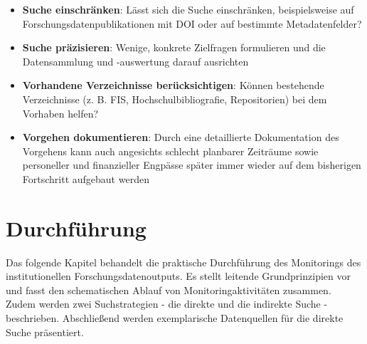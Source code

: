 \documentclass[
  ngerman,
  letterpaper,
  DIV=11]{scrreprt}
\providecommand{\tightlist}{%
  \setlength{\itemsep}{0pt}\setlength{\parskip}{0pt}}
\begin{document}
\begin{tcolorbox}
\begin{itemize}
\begin{itemize}
    \begin{itemize}
    \tightlist
    \item
      \textbf{Abfragemöglichkeiten}: Passen sie zu den vorhandenen
      technischen Möglichkeiten? Kann z. B. die geplante Suchanfrage
      über die Nutzeroberfläche gestellt werden, falls keine Nutzung der
      API möglich ist? Ist ein Komplettexport der Trefferliste in einem
      geeigneten Dateiformat möglich?
    \item
      \textbf{Metadaten}: Sind bestimmte Metadaten besonders wichtig (z.
      B. Affiliations-Metadatenfeld)? Können diese bei der gewählten
      Datenquelle abgefragt werden?
    \item
      \textbf{Offenheit}: Ist die Datenquelle frei von Zugangs- und
      Nutzungsbeschränkungen?
    \end{itemize}
  \end{itemize}
\item
  \textbf{Suche einschränken}: Lässt sich die Suche einschränken,
  beispielsweise auf Forschungsdatenpublikationen mit DOI oder auf
  bestimmte Metadatenfelder?
\item
  \textbf{Suche präzisieren}: Wenige, konkrete Zielfragen formulieren
  und die Datensammlung und -auswertung darauf ausrichten
\item
  \textbf{Vorhandene Verzeichnisse berücksichtigen}: Können bestehende
  Verzeichnisse (z. B. FIS, Hochschulbibliografie, Repositorien) bei dem
  Vorhaben helfen?
\item
  \textbf{Vorgehen dokumentieren}: Durch eine detaillierte Dokumentation
  des Vorgehens kann auch angesichts schlecht planbarer Zeiträume sowie
  personeller und finanzieller Engpässe später immer wieder auf dem
  bisherigen Fortschritt aufgebaut werden
\end{itemize}

\end{tcolorbox}


\chapter{Durchführung}\label{durchfuxfchrung}

Das folgende Kapitel behandelt die praktische Durchführung des
Monitorings des institutionellen Forschungsdatenoutputs. Es stellt
leitende Grundprinzipien vor und fasst den schematischen Ablauf von
Monitoringaktivitäten zusammen. Zudem werden zwei Suchstrategien - die
direkte und die indirekte Suche - beschrieben. Abschließend werden
exemplarische Datenquellen für die direkte Suche präsentiert.
\end{document}
